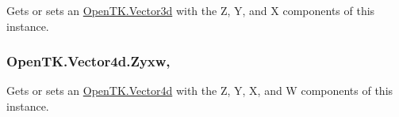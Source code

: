 Gets or sets an \hyperlink{struct_open_t_k_1_1_vector3d}{Open\-T\-K.\-Vector3d} with the Z, Y, and X components of this instance. 

\hypertarget{struct_open_t_k_1_1_vector4d_a38de2947c9afdbaaee67e21e94f22775}{
\subsubsection[{Zyxw}]{ Open\-T\-K.\-Vector4d.\-Zyxw\hspace{0.3cm}{\ttfamily [get]}, {\ttfamily [set]}}}\label{struct_open_t_k_1_1_vector4d_a38de2947c9afdbaaee67e21e94f22775}


Gets or sets an \hyperlink{struct_open_t_k_1_1_vector4d}{Open\-T\-K.\-Vector4d} with the Z, Y, X, and W components of this instance. 

